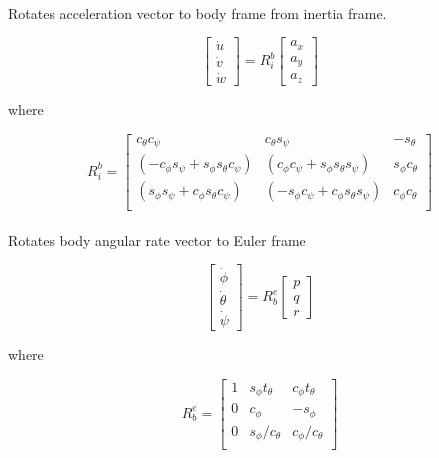 \documentclass[]{article}
\begin{document}
\paragraph*{}
Rotates acceleration vector to body frame from inertia frame.

\begin{equation}
	\begin{bmatrix}
		\dot{u} \\
		\dot{v}\\
		\dot{w}
	\end{bmatrix} = 
	R_{i}^{b}
	\begin{bmatrix}
		a_x \\
		a_y \\
		a_z
	\end{bmatrix}
\end{equation}

where 

\begin{equation}
	R_{i}^b = 
	\begin{bmatrix}
		c_\theta c_\psi & c_\theta s_\psi & -s_\theta\\
		(-c_\phi s_\psi + s_\phi s_\theta c_\psi) & (c_\phi c_\psi + s_\phi s_\theta s_\psi) & s_\phi c_\theta\\
		(s_\phi s_\psi + c_\phi s_\theta c_\psi) & (-s_\phi c_\psi + c_\phi s_\theta s_\psi) & c_\phi c_\theta\\
	\end{bmatrix}
\end{equation}

\paragraph*{}
Rotates body angular rate vector to Euler frame

\begin{equation}
	\begin{bmatrix}
		\dot{\phi} \\
		\dot{\theta}\\
		\dot{\psi}
	\end{bmatrix} = 
	R_{b}^{e}
	\begin{bmatrix}
		p \\
		q \\
		r
	\end{bmatrix}
\end{equation}

where 

\begin{equation}
R_{b}^e = 
\begin{bmatrix}
1 & s_\phi t_\theta & c_\phi t_\theta\\
0 & c_\phi & -s_\phi\\
0 & s_\phi/c_\theta & c_\phi/c_\theta\\
\end{bmatrix}
\end{equation}
\end{document}
